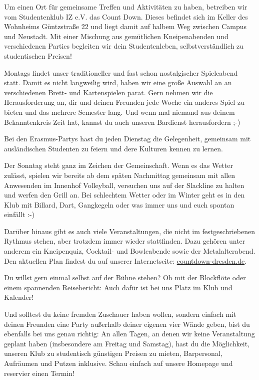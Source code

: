 

Um einen Ort für gemeinsame Treffen und Aktivitäten zu haben, betreiben wir vom Studentenklub IZ e.V. das Count Down.
Dieses befindet sich im Keller des Wohnheims Güntzstraße 22 und liegt damit auf halbem Weg zwischen Campus und Neustadt.
Mit einer Mischung aus gemütlichen Kneipenabenden und verschiedenen Parties begleiten wir dein Studentenleben, selbstverständlich zu studentischen Preisen!

Montags findet unser traditioneller und fast schon nostalgischer Spieleabend statt.
Damit es nicht langweilig wird, haben wir eine große Auswahl an an verschiedenen Brett- und Kartenspielen parat.
Gern nehmen wir die Herausforderung an, dir und deinen Freunden jede Woche ein anderes Spiel zu bieten und das mehrere Semester lang.
Und wenn mal niemand aus deinem Bekanntenkreis Zeit hat, kannst du auch unseren Bardienst herausfordern ;-)

Bei den Erasmus-Partys hast du jeden Dienstag die Gelegenheit, gemeinsam mit ausländischen Studenten zu feiern und dere Kulturen kennen zu lernen.

Der Sonntag steht ganz im Zeichen der Gemeinschaft.
Wenn es das Wetter zulässt, spielen wir bereits ab dem späten Nachmittag gemeinsam mit allen Anwesenden im Innenhof Volleyball, versuchen uns auf der Slackline zu halten und werfen den Grill an.
Bei schlechtem Wetter oder im Winter geht es in den Klub mit Billard, Dart, Gangkegeln oder was immer uns und euch spontan einfällt :-)

Darüber hinaus gibt es auch viele Veranstaltungen, die nicht im festgeschriebenen Rythmus stehen, aber trotzdem immer wieder stattfinden.
Dazu gehören unter anderem ein Kneipenquiz, Cocktail- und Bowleabende sowie der Metalalterabend.
Den aktuellen Plan findest du auf unserer Internetseite: \url{countdown-dresden.de}.

Du willst gern einmal selbst auf der Bühne stehen?
Ob mit der Blockflöte oder einem spannenden Reisebericht:
Auch dafür ist bei uns Platz im Klub und Kalender!

Und solltest du keine fremden Zuschauer haben wollen, sondern einfach mit deinen Freunden eine Party außerhalb deiner eigenen vier Wände geben, bist du ebenfalls bei uns genau richtig:
An allen Tagen, an denen wir keine Veranstaltung geplant haben (insbesondere am Freitag und Samstag), hast du die Möglichkeit, unseren Klub zu studentisch günstigen Preisen zu mieten, Barpersonal, Aufräumen und Putzen inklusive.
Schau einfach auf unsere Homepage und reservier einen Termin!

